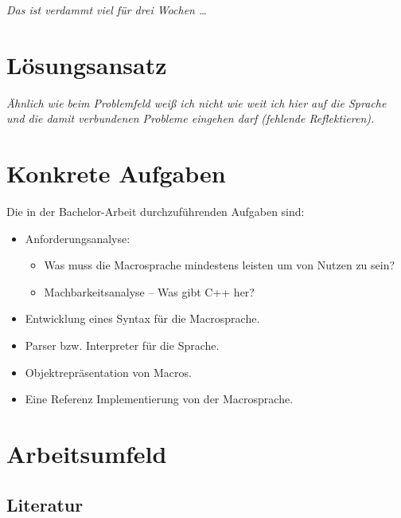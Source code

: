   \textit{%
    \color{DarkSlateGray}%
    Das ist verdammt viel für drei Wochen \ldots
  }

\section{Lösungsansatz}
\label{sec:loesungsansatz}
  \textit{%
    \color{DarkSlateGray}%
    Ähnlich wie beim Problemfeld weiß ich nicht wie weit ich hier auf die Sprache und die damit verbundenen Probleme eingehen darf (fehlende Reflektieren).
  }

\section{Konkrete Aufgaben}
\label{sec:konkrete_aufgaben}
  Die in der Bachelor-Arbeit durchzuführenden Aufgaben sind:
  \begin{itemize}
    \item Anforderungsanalyse:
      \begin{itemize}
        \item Was muss die Macrosprache mindestens leisten um von Nutzen zu sein?
        \item Machbarkeitsanalyse -- Was gibt C++ her?
      \end{itemize}
    \item Entwicklung eines Syntax für die Macrosprache.
    \item Parser bzw. Interpreter für die Sprache.
    \item Objektrepräsentation von Macros.
    \item Eine Referenz Implementierung von der Macrosprache.
  \end{itemize}

\section{Arbeitsumfeld}
\label{sec:arbeitsumfeld}

  \subsection{Literatur}
  \label{ssec:literatur}
    \nocite{*}
    \printbibliography

